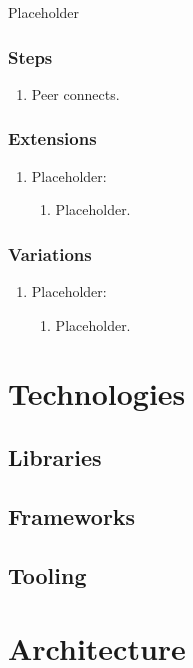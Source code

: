 \documentclass[a4paper, 11pt, twocolumn, twoside]{report}
\begin{document}
Placeholder

\subsubsection{Steps}

\begin{enumerate}
 \item Peer connects.
\end{enumerate}

\subsubsection{Extensions}
\begin{enumerate}
  \item Placeholder:
	\begin{enumerate}
	  \item Placeholder.
	\end{enumerate}
\end{enumerate}

\subsubsection{Variations}
\begin{enumerate}
  \item Placeholder:
	\begin{enumerate}
	  \item Placeholder.
	\end{enumerate}
\end{enumerate}

\section{Technologies}

\subsection{Libraries}

\subsection{Frameworks}

\subsection{Tooling}

\section{Architecture}
\end{document}
